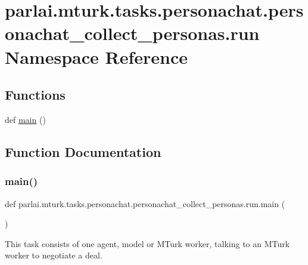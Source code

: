\hypertarget{namespaceparlai_1_1mturk_1_1tasks_1_1personachat_1_1personachat__collect__personas_1_1run}{}\section{parlai.\+mturk.\+tasks.\+personachat.\+personachat\+\_\+collect\+\_\+personas.\+run Namespace Reference}
\label{namespaceparlai_1_1mturk_1_1tasks_1_1personachat_1_1personachat__collect__personas_1_1run}
\subsection*{Functions}
\begin{DoxyCompactItemize}
\item 
def \hyperlink{namespaceparlai_1_1mturk_1_1tasks_1_1personachat_1_1personachat__collect__personas_1_1run_a334f052cd3e8caffe3a2a4b7e4b668e2}{main} ()
\end{DoxyCompactItemize}


\subsection{Function Documentation}
\mbox{\label{namespaceparlai_1_1mturk_1_1tasks_1_1personachat_1_1personachat__collect__personas_1_1run_a334f052cd3e8caffe3a2a4b7e4b668e2}} 
\subsubsection{\texorpdfstring{main()}{main()}}
{\footnotesize\ttfamily def parlai.\+mturk.\+tasks.\+personachat.\+personachat\+\_\+collect\+\_\+personas.\+run.\+main (\begin{DoxyParamCaption}{ }\end{DoxyParamCaption})}

\begin{DoxyVerb}This task consists of one agent, model or MTurk worker, talking to an MTurk worker
to negotiate a deal.
\end{DoxyVerb}
 

